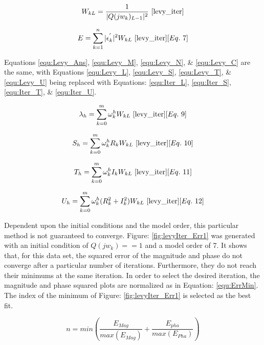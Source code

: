 \begin{equation}
    \label{equ:iter_Weight}
    W_{kL} = \frac{1}{|Q(jw_k)_{L-1}|^2}
    ~\cite{levy_iter}
\end{equation}

\begin{equation}
    \label{equ:iter_Err}
    E = \sum_{k=1}^{n} |\epsilon _k ^{'}|^2W_{kL}
    ~\cite{levy_iter}[Eq.~7]
\end{equation}

Equations \eqref{equ:Levy_Ans}, \eqref{equ:Levy_M}, \eqref{equ:Levy_N}, \& \eqref{equ:Levy_C} are the same, with Equations \eqref{equ:Levy_L}, \eqref{equ:Levy_S}, \eqref{equ:Levy_T}, \& \eqref{equ:Levy_U} being replaced with Equations: \eqref{equ:Iter_L}, \eqref{equ:Iter_S}, \eqref{equ:Iter_T}, \& \eqref{equ:Iter_U}.

\begin{equation}
    \label{equ:Iter_L}
    \lambda _h = \sum_{k=0}^{m} \omega _k ^hW_{kL}
    ~\cite{levy_iter}[Eq.~9]
\end{equation}

\begin{equation}
    \label{equ:Iter_S}
    S_h = \sum_{k=0}^{m} \omega _k ^h R_kW_{kL}
    ~\cite{levy_iter}[Eq.~10]
\end{equation}

\begin{equation}
    \label{equ:Iter_T}
    T_h = \sum_{k=0}^{m} \omega _k ^h I_kW_{kL}
    ~\cite{levy_iter}[Eq.~11]
\end{equation}

\begin{equation}
    \label{equ:Iter_U}
    U_h = \sum_{k=0}^{m} \omega _k ^h (R_k ^2 + I_k ^2)W_{kL}
    ~\cite{levy_iter}[Eq.~12]
\end{equation}

Dependent upon the initial conditions and the model order, this particular method is not guaranteed to converge. Figure: \ref{fig:levyIter_Err1} was generated with an initial condition of $Q(jw_k) == 1$ and a model order of 7. It shows that, for this data set, the squared error of the magnitude and phase do not converge after a particular number of iterations. Furthermore, they do not reach their minimums at the same iteration. In order to select the desired iteration, the magnitude and phase squared plots are normalized as in Equation: \eqref{equ:ErrMin}. The index of the minimum of Figure: \ref{fig:levyIter_Err1} is selected as the best fit.

\begin{equation}
\label{equ:ErrMin}
n = min(\frac{E_{Mag}}{max(E_{Mag})} + \frac{E_{pha}}{max(E_{Pha})})
\end{equation}

